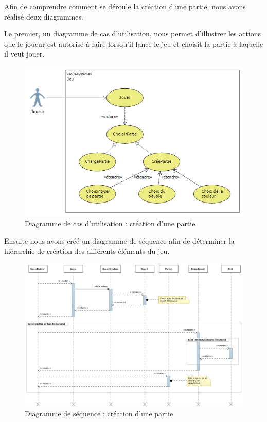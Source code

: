 Afin de comprendre comment se déroule la création d'une partie, nous avons réalisé deux diagrammes.

Le premier, un diagramme de cas d'utilisation, nous permet d'illustrer les actions que le joueur est autorisé à faire lorsqu'il lance le jeu et choisit la partie à laquelle il veut jouer.
\begin{figure}[!h]
\centering
\includegraphics[width=\textwidth]{Parties/Images/cdu_CreationPartie.png}
\caption{Diagramme de cas d'utilisation : création d'une partie}
\label{fig:cdu_CreationPartie}
\end{figure}

\newpage
Ensuite nous avons créé un diagramme de séquence afin de déterminer la hiérarchie de création des différents éléments du jeu.
\begin{figure}[!h]
\centering
\includegraphics[width=\textwidth]{Parties/Images/seq_CreationPartie.png}
\caption{Diagramme de séquence : création d'une partie}
\label{fig:seq_CreationPartie}
\end{figure}
